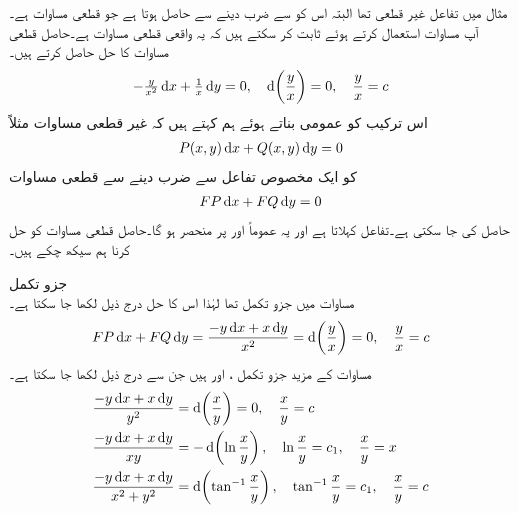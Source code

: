 مثال  میں تفاعل  غیر قطعی تھا البتہ اس کو  سے ضرب دینے
 سے  حاصل ہوتا ہے جو قطعی مساوات  ہے۔آپ مساوات  استعمال کرتے ہوئے ثابت کر سکتے ہیں کہ یہ واقعی قطعی مساوات ہے۔حاصل قطعی مساوات کا حل حاصل کرتے ہیں۔
\begin{align}\label{مساوات_سادہ_اول_جزو_تکمل_الف}
-\tfrac{y}{x^2}\dif x+\tfrac{1}{x}\dif y=0, \quad \dif \left(\frac{y}{x}\right)=0,\quad \frac{y}{x}=c
\end{align}
اس ترکیب کو عمومی بناتے ہوئے ہم کہتے ہیں کہ غیر قطعی مساوات مثلاً
\begin{align}\label{مساوات_سادہ_اول_جزو_تکمل_حصول_الف}
P(x,y)\dif x+Q(x,y)\dif y=0
\end{align}
کو ایک مخصوص تفاعل  سے ضرب دینے سے قطعی مساوات
\begin{align}
FP\dif x+FQ\dif y=0
\end{align}
حاصل کی جا سکتی ہے۔تفاعل   کہلاتا ہے اور یہ عموماً  اور  پر منحصر ہو گا۔حاصل قطعی مساوات کو حل کرنا ہم سیکھ چکے ہیں۔

\quad جزو تکمل\\
مساوات  میں جزو تکمل  تھا لہٰذا اس کا حل درج ذیل لکھا جا سکتا ہے۔
\begin{align*}
FP\dif x+FQ\dif y=\frac{-y\dif x+x\dif y}{x^2}=\dif \left(\frac{y}{x}\right)=0,\quad \frac{y}{x}=c
\end{align*}
مساوات  کے  مزید جزو تکمل ،  اور  ہیں جن سے درج ذیل لکھا جا سکتا ہے۔
\begin{align*}
\frac{-y\dif x+x\dif y}{y^2}&=\dif \left(\frac{x}{y}\right)=0, \quad \frac{x}{y}=c\\
\frac{-y\dif x+x\dif y}{xy}&=-\dif \left(\ln \frac{x}{y}\right),\quad \ln\frac{x}{y}=c_1,\quad \frac{x}{y}=x\\
\frac{-y\dif x+x\dif y}{x^2+y^2}&=\dif \left(\tan^{-1}\frac{x}{y}\right),\quad \tan^{-1}\frac{x}{y}=c_1,\quad \frac{x}{y}=c
\end{align*} 

